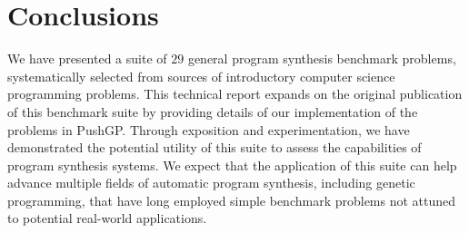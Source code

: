 \documentclass{sig-alternate}
\begin{document}
\section{Conclusions}

We have presented a suite of $29$ general program synthesis benchmark problems, systematically selected from sources of introductory computer science programming problems. This technical report expands on the original publication of this benchmark suite \cite{Helmuth:2015:GECCO} by providing details of our implementation of the problems in PushGP. Through exposition and experimentation, we have demonstrated the potential utility of this suite to assess the capabilities of program synthesis systems. We expect that the application of this suite can help advance multiple fields of automatic program synthesis, including genetic programming, that have long employed simple benchmark problems not attuned to potential real-world applications.





%
\end{document}
